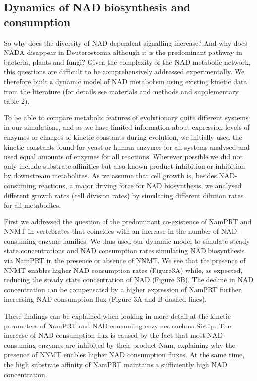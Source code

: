 \subsection{Dynamics of NAD biosynthesis and consumption}

So why does the diversity of NAD-dependent signalling increase? And why does NADA disappear in Deuterostomia although it is the predominant pathway in bacteria, plants and fungi? Given the complexity of the NAD metabolic network, this questions are difficult to be comprehensively addressed experimentally. We therefore built a dynamic model of NAD metabolism using existing kinetic data from the literature (for details see materials and methods and supplementary table 2).

To be able to compare metabolic features of evolutionary quite different systems in our simulations, and as we have limited information about expression levels of enzymes or changes of kinetic constants during evolution, we initially used the kinetic constants found for yeast or human enzymes for all systems analysed and used equal amounts of enzymes for all reactions. Wherever possible we did not only include substrate affinities but also known product inhibition or inhibition by downstream metabolites. As we assume that cell growth is, besides NAD-consuming reactions, a major driving force for NAD biosynthesis, we analysed different growth rates (cell division rates) by simulating different dilution rates for all metabolites.

First we addressed the question of the predominant co-existence of NamPRT and NNMT in vertebrates that coincides with an increase in the number of NAD-consuming enzyme families. We thus used our dynamic model to simulate steady state concentrations and NAD consumption rates simulating NAD biosynthesis via NamPRT in the presence or absence of NNMT. We see that the presence of NNMT enables higher NAD consumption rates (Figure3A) while, as expected, reducing the steady state concentration of NAD (Figure 3B). The decline in NAD concentration can be compensated by a higher expression of NamPRT further increasing NAD consumption flux (Figure 3A and B dashed lines).

These findings can be explained when looking in more detail at the kinetic parameters of NamPRT and NAD-consuming enzymes such as Sirt1p. The increase of NAD consumption flux is caused by the fact that most NAD-consuming enzymes are inhibited by their product Nam, explaining why the presence of NNMT enables higher NAD consumption fluxes. At the same time, the high substrate affinity of NamPRT maintains a sufficiently high NAD concentration.

